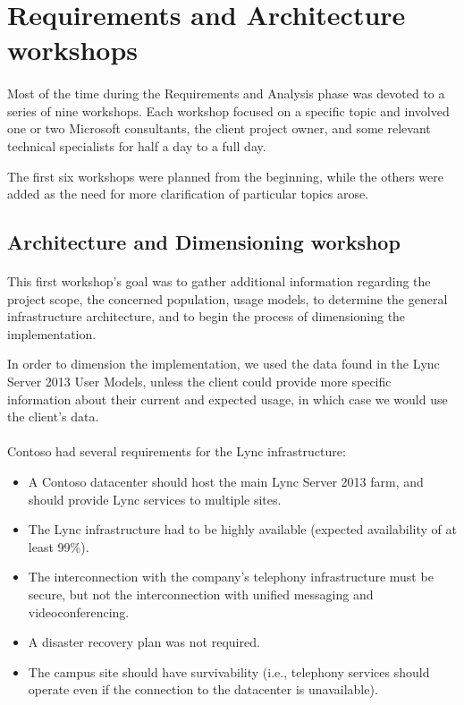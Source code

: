 \section{Requirements and Architecture workshops}

	\paragraph{}
	Most of the time during the Requirements and Analysis phase was devoted to a series of nine workshops. Each workshop focused on a specific topic and involved one or two Microsoft consultants, the client project owner, and some relevant technical specialists for half a day to a full day.

	The first six workshops were planned from the beginning, while the others were added as the need for more clarification of particular topics arose.


\subsection{Architecture and Dimensioning workshop}

	\paragraph{}
		This first workshop's goal was to gather additional information regarding the project scope, the concerned population, usage models, to determine the general infrastructure architecture, and to begin the process of dimensioning the implementation.

		In order to dimension the implementation, we used the data found in the Lync Server 2013 User Models\cite{microsoft_technet_lync_2013}, unless the client could provide more specific information about their current and expected usage, in which case we would use the client's data.

	\paragraph{}
		Contoso had several requirements for the Lync infrastructure:
		\begin{itemize}
		\item A Contoso datacenter should host the main Lync Server 2013 farm, and should provide Lync services to multiple sites.
		\item The Lync infrastructure had to be highly available (expected availability of at least 99\%).
		\item The interconnection with the company's telephony infrastructure must be secure, but not the interconnection with unified messaging and videoconferencing.
		\item A disaster recovery plan was not required.
		\item The campus site should have survivability (i.e., telephony services should operate even if the connection to the datacenter is unavailable).
		\end{itemize} 


